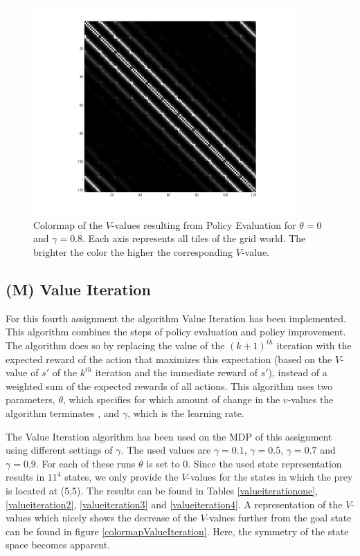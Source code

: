 \documentclass{article}
\begin{document}
\begin{figure}[htb]\label{colormapPolicyEvaluation}
		\centering
        \includegraphics[width=0.9\textwidth]{VMatrixPolicyEvaluation.png}
        \caption{	 Colormap of the $V$-values resulting from Policy Evaluation for
        			 $\theta=0$ and $\gamma = 0.8$. \newline
        			 Each axis represents all tiles of the grid world.
        			 The brighter the color the higher the corresponding $V$-value.}        
\end{figure}

\subsection{(M) Value Iteration}
For this fourth assignment the algorithm Value Iteration has been implemented. This algorithm combines the steps of policy evaluation and policy improvement. The algorithm does so by replacing the value of the $(k+1)^{th}$ iteration with the expected reward of the action that maximizes this expectation (based on the $V$-value of $s' $ of the $k^{th}$ iteration and the immediate reward of $s' $), instead of a weighted sum of the expected rewards of all actions. This algorithm uses two parameters, $\theta$, which specifies for which amount of change in the $v$-values the algorithm terminates , and $\gamma$, which is the learning rate.

The Value Iteration algorithm has been used on the MDP of this assignment using different settings of $\gamma$. The used values are $\gamma = 0.1$, $\gamma = 0.5$, $\gamma = 0.7$ and $\gamma = 0.9$. For each of these runs $\theta$ is set to 0. Since the used state representation results in $11^4$ states, we only provide the $V$-values for the states in which the prey is located at (5,5). The results can be found in Tables \ref{valueiterationone}, \ref{valueiteration2}, \ref{valueiteration3} and \ref{valueiteration4}. A representation of the $V$-values which nicely shows the decrease of the $V$-values further from the goal state can be found in figure \ref{colormapValueIteration}. Here, the symmetry of the state space becomes apparent.
\end{document}
